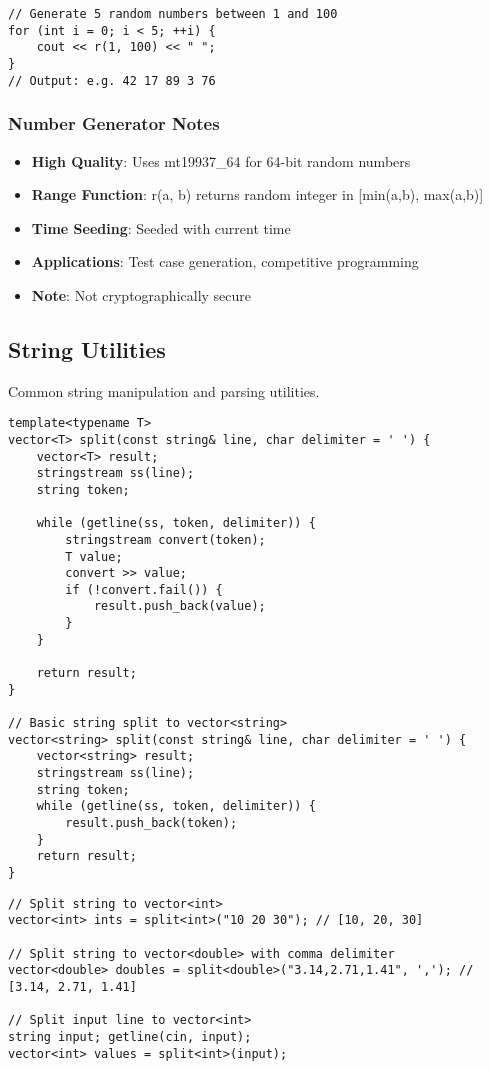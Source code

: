 \documentclass[11pt,a4paper]{article}
\begin{document}
\begin{lstlisting}[caption={Random Number Generator Example Usage}]
// Generate 5 random numbers between 1 and 100
for (int i = 0; i < 5; ++i) {
    cout << r(1, 100) << " ";
}
// Output: e.g. 42 17 89 3 76
\end{lstlisting}

\subsubsection*{Number Generator Notes}
\begin{itemize}
\item \textbf{High Quality}: Uses mt19937\_64 for 64-bit random numbers
\item \textbf{Range Function}: r(a, b) returns random integer in [min(a,b), max(a,b)]
\item \textbf{Time Seeding}: Seeded with current time
\item \textbf{Applications}: Test case generation, competitive programming
\item \textbf{Note}: Not cryptographically secure
\end{itemize}

\newpage

\subsection{String Utilities}
Common string manipulation and parsing utilities.

\begin{lstlisting}[caption={String Split Utility}]
template<typename T>
vector<T> split(const string& line, char delimiter = ' ') {
    vector<T> result;
    stringstream ss(line);
    string token;

    while (getline(ss, token, delimiter)) {
        stringstream convert(token);
        T value;
        convert >> value;
        if (!convert.fail()) {
            result.push_back(value);
        }
    }

    return result;
}

// Basic string split to vector<string>
vector<string> split(const string& line, char delimiter = ' ') {
    vector<string> result;
    stringstream ss(line);
    string token;
    while (getline(ss, token, delimiter)) {
        result.push_back(token);
    }
    return result;
}
\end{lstlisting}

\begin{lstlisting}[caption={String Split Examples}]
// Split string to vector<int>
vector<int> ints = split<int>("10 20 30"); // [10, 20, 30]

// Split string to vector<double> with comma delimiter
vector<double> doubles = split<double>("3.14,2.71,1.41", ','); // [3.14, 2.71, 1.41]

// Split input line to vector<int>
string input; getline(cin, input);
vector<int> values = split<int>(input);
\end{lstlisting}
\end{document}
